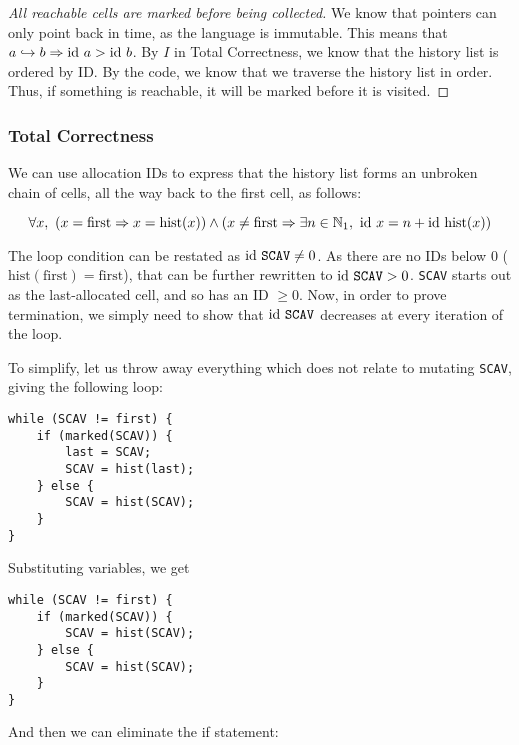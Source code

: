 
\begin{proof}[All reachable cells are marked before being collected]
  We know that pointers can only point back in time, as the language
  is immutable. This means that $a \hookrightarrow b \Rightarrow \mathrm{id}~a >
  \mathrm{id}~b$. By $I$ in Total Correctness, we know that the history list
  is ordered by ID. By the code, we know that we traverse the history
  list in order. Thus, if something is reachable, it will be marked
  before it is visited.
\end{proof}

\subsubsection{Total Correctness}

We can use allocation IDs to express that the history list forms an
unbroken chain of cells, all the way back to the first cell, as
follows:

\[\forall x,\ \left(x = \mathrm{first} \Rightarrow x =
  \mathrm{hist}(x)\right) \land \left(x \neq \mathrm{first} \Rightarrow
  \exists n \in \mathbb N_{1},\ \mathrm{id}~x = n + \mathrm{id}~\mathrm{hist}(x)\right)\]

The loop condition can be restated as $\mathrm{id}~\mathtt{SCAV} \neq 0$. As
there are no IDs below 0 ($\mathrm{hist}(\mathrm{first}) =
\mathrm{first}$), that can be further rewritten to $\mathrm{id}~\mathtt{SCAV}
> 0$. \texttt{SCAV} starts out as the last-allocated cell, and so has
an ID $\geq 0$. Now, in order to prove termination, we simply need to
show that $\mathrm{id}~\mathtt{SCAV}$ decreases at every iteration of the
loop.

To simplify, let us throw away everything which does not relate to
mutating \texttt{SCAV}, giving the following loop:

\begin{lstlisting}
while (SCAV != first) {
    if (marked(SCAV)) {
        last = SCAV;
        SCAV = hist(last);
    } else {
        SCAV = hist(SCAV);
    }
}
\end{lstlisting}

Substituting variables, we get

\begin{lstlisting}
while (SCAV != first) {
    if (marked(SCAV)) {
        SCAV = hist(SCAV);
    } else {
        SCAV = hist(SCAV);
    }
}
\end{lstlisting}

And then we can eliminate the if statement:

